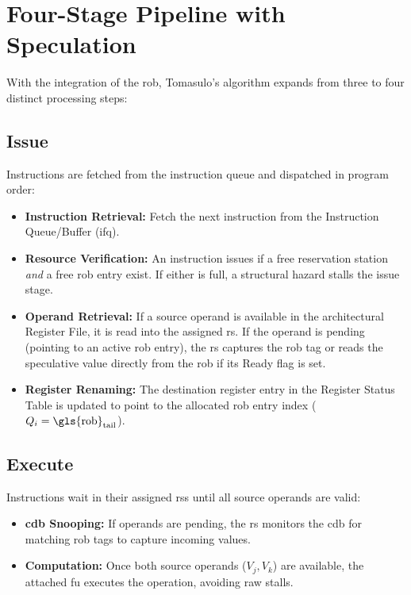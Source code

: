 \section{Four-Stage Pipeline with Speculation}

With the integration of the \gls{rob}, Tomasulo's algorithm expands from three to four distinct processing steps:

\subsection{Issue}
Instructions are fetched from the instruction queue and dispatched in program order:
\begin{itemize}
    \item \textbf{Instruction Retrieval:} Fetch the next instruction from the Instruction Queue/Buffer (\gls{ifq}).
    \item \textbf{Resource Verification:} An instruction issues if a free reservation station \textit{and} a free \gls{rob} entry exist. If either is full, a structural hazard stalls the issue stage.
    \item \textbf{Operand Retrieval:} If a source operand is available in the architectural Register File, it is read into the assigned \gls{rs}. If the operand is pending (pointing to an active \gls{rob} entry), the \gls{rs} captures the \gls{rob} tag or reads the speculative value directly from the \gls{rob} if its Ready flag is set.
    \item \textbf{Register Renaming:} The destination register entry in the Register Status Table is updated to point to the allocated \gls{rob} entry index ($Q_i = \text{\gls{rob}}_{\text{tail}}$).
\end{itemize}

\subsection{Execute}
Instructions wait in their assigned \glspl{rs} until all source operands are valid:
\begin{itemize}
    \item \textbf{\gls{cdb} Snooping:} If operands are pending, the \gls{rs} monitors the \gls{cdb} for matching \gls{rob} tags to capture incoming values.
    \item \textbf{Computation:} Once both source operands ($V_j, V_k$) are available, the attached \gls{fu} executes the operation, avoiding \gls{raw} stalls.
\end{itemize}

